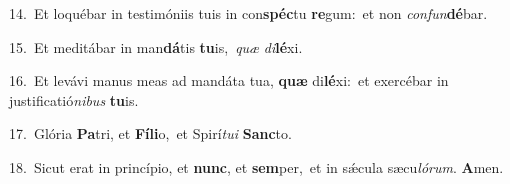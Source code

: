 {\numbfont\textcolor{\numbcolor}{14.}}~Et loquébar in testimóniis tuis in con\-\textbf{spéc}\-tu \textbf{re}\-gum:~\star et non \textit{con}\-\textit{fun}\textbf{dé}bar.\par
{\numbfont\textcolor{\numbcolor}{15.}}~Et meditábar in man\-\textbf{dá}\-tis \textbf{tu}\-is,~\star \textit{quæ} \textit{di}\-\textbf{lé}xi.\par
{\numbfont\textcolor{\numbcolor}{16.}}~Et levávi manus meas ad mandáta tua, \textbf{quæ} di\-\textbf{lé}\-xi:~\star et exercébar in justificatió\-\textit{ni}\-\textit{bus} \textbf{tu}\-is.\par
{\numbfont\textcolor{\numbcolor}{17.}}~Glória \textbf{Pa}\-tri, et \textbf{Fí}\-\textbf{li}o,~\star et Spirí\-\textit{tu}\-\textit{i} \textbf{Sanc}\-to.\par
{\numbfont\textcolor{\numbcolor}{18.}}~Sicut erat in princípio, et \textbf{nunc}\-, et \textbf{sem}\-per,~\star et in sǽcula sæcu\-\textit{ló}\-\textit{rum}. \textbf{A}\-men.\par
